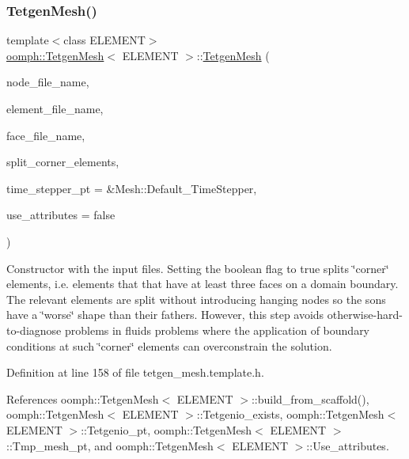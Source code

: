\subsubsection{\texorpdfstring{Tetgen\+Mesh()}{TetgenMesh()}\hspace{0.1cm}{\footnotesize\ttfamily [4/6]}}
{\footnotesize\ttfamily template$<$class E\+L\+E\+M\+E\+NT$>$ \\
\hyperlink{classoomph_1_1TetgenMesh}{oomph\+::\+Tetgen\+Mesh}$<$ E\+L\+E\+M\+E\+NT $>$\+::\hyperlink{classoomph_1_1TetgenMesh}{Tetgen\+Mesh} (\begin{DoxyParamCaption}\item[{const std\+::string \&}]{node\+\_\+file\+\_\+name,  }\item[{const std\+::string \&}]{element\+\_\+file\+\_\+name,  }\item[{const std\+::string \&}]{face\+\_\+file\+\_\+name,  }\item[{const bool \&}]{split\+\_\+corner\+\_\+elements,  }\item[{Time\+Stepper $\ast$}]{time\+\_\+stepper\+\_\+pt = {\ttfamily \&Mesh\+:\+:Default\+\_\+TimeStepper},  }\item[{const bool \&}]{use\+\_\+attributes = {\ttfamily false} }\end{DoxyParamCaption})\hspace{0.3cm}{\ttfamily [inline]}}



Constructor with the input files. Setting the boolean flag to true splits \char`\"{}corner\char`\"{} elements, i.\+e. elements that that have at least three faces on a domain boundary. The relevant elements are split without introducing hanging nodes so the sons have a \char`\"{}worse\char`\"{} shape than their fathers. However, this step avoids otherwise-\/hard-\/to-\/diagnose problems in fluids problems where the application of boundary conditions at such \char`\"{}corner\char`\"{} elements can overconstrain the solution. 



Definition at line 158 of file tetgen\+\_\+mesh.\+template.\+h.



References oomph\+::\+Tetgen\+Mesh$<$ E\+L\+E\+M\+E\+N\+T $>$\+::build\+\_\+from\+\_\+scaffold(), oomph\+::\+Tetgen\+Mesh$<$ E\+L\+E\+M\+E\+N\+T $>$\+::\+Tetgenio\+\_\+exists, oomph\+::\+Tetgen\+Mesh$<$ E\+L\+E\+M\+E\+N\+T $>$\+::\+Tetgenio\+\_\+pt, oomph\+::\+Tetgen\+Mesh$<$ E\+L\+E\+M\+E\+N\+T $>$\+::\+Tmp\+\_\+mesh\+\_\+pt, and oomph\+::\+Tetgen\+Mesh$<$ E\+L\+E\+M\+E\+N\+T $>$\+::\+Use\+\_\+attributes.

